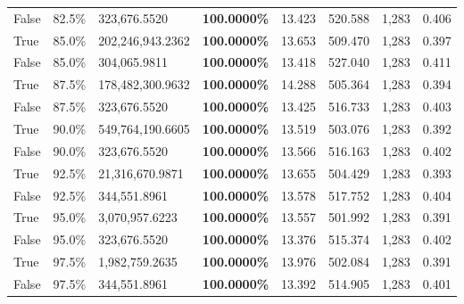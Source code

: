 \begin{table}[H]
\begin{tabular}{lllrllll}
\cline{1-8}
False & 82.5\% & 323,676.5520 & \bfseries \color{red} 100.0000\% & 13.423 & 520.588 & 1,283 & 0.406 \\
\cline{1-8}
True & 85.0\% & 202,246,943.2362 & \bfseries \color{red} 100.0000\% & 13.653 & 509.470 & 1,283 & 0.397 \\
\cline{1-8}
False & 85.0\% & \color{red} 304,065.9811 & \bfseries \color{red} 100.0000\% & 13.418 & 527.040 & 1,283 & 0.411 \\
\cline{1-8}
True & 87.5\% & 178,482,300.9632 & \bfseries \color{red} 100.0000\% & 14.288 & 505.364 & 1,283 & 0.394 \\
\cline{1-8}
False & 87.5\% & 323,676.5520 & \bfseries \color{red} 100.0000\% & 13.425 & 516.733 & 1,283 & 0.403 \\
\cline{1-8}
True & 90.0\% & 549,764,190.6605 & \bfseries \color{red} 100.0000\% & 13.519 & 503.076 & 1,283 & 0.392 \\
\cline{1-8}
False & 90.0\% & 323,676.5520 & \bfseries \color{red} 100.0000\% & 13.566 & 516.163 & 1,283 & 0.402 \\
\cline{1-8}
True & 92.5\% & 21,316,670.9871 & \bfseries \color{red} 100.0000\% & 13.655 & 504.429 & 1,283 & 0.393 \\
\cline{1-8}
False & 92.5\% & 344,551.8961 & \bfseries \color{red} 100.0000\% & 13.578 & 517.752 & 1,283 & 0.404 \\
\cline{1-8}
True & 95.0\% & 3,070,957.6223 & \bfseries \color{red} 100.0000\% & 13.557 & 501.992 & 1,283 & 0.391 \\
\cline{1-8}
False & 95.0\% & 323,676.5520 & \bfseries \color{red} 100.0000\% & 13.376 & 515.374 & 1,283 & 0.402 \\
\cline{1-8}
True & 97.5\% & 1,982,759.2635 & \bfseries \color{red} 100.0000\% & 13.976 & 502.084 & 1,283 & 0.391 \\
\cline{1-8}
False & 97.5\% & 344,551.8961 & \bfseries \color{red} 100.0000\% & 13.392 & 514.905 & 1,283 & 0.401 \\
\cline{1-8}
\bottomrule
\end{tabular}
\end{table}
